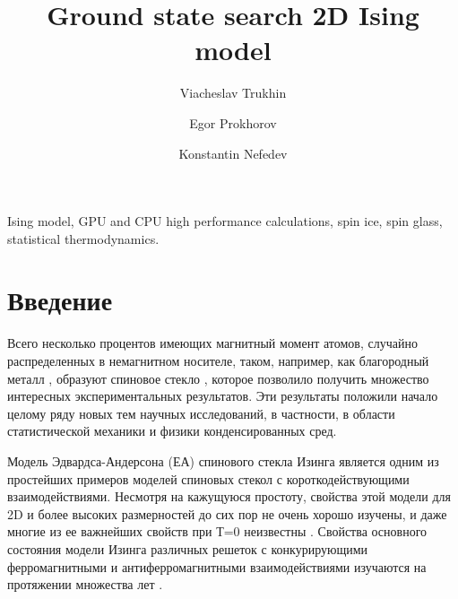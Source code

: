 \documentclass[utf8, babel, sor, jor, amsmath, amssymb, reprint]{elsarticle} %
\begin{document}
\begin{frontmatter}


\title{Ground state search 2D Ising model}

\author[mainaddress, secondaryaddress]{Viacheslav Trukhin}

\author[mainaddress]{Egor Prokhorov}

\author[mainaddress, secondaryaddress]{Konstantin Nefedev}


\address[mainaddress]{Far Eastern Federal University, Vladivostok, Russky Island, 10 Ajax Bay, 690922, the Russian Federation}
\address[secondaryaddress]{Institute of Applied Mathematics, Far Eastern Branch, Russian Academy of Science, Vladivostok, Radio 7, 690041, the Russian Federation}

\begin{abstract}


\end{abstract}


\begin{keyword}
Ising model, GPU and CPU high performance calculations, spin ice, spin glass, statistical thermodynamics.

\end{keyword}


\end{frontmatter}

\linenumbers
\newpage
\tableofcontents

\newpage
\section{Введение}

Всего несколько процентов имеющих магнитный момент атомов, случайно распределенных в немагнитном носителе, таком, например, как благородный металл  \cite{finkler1989spin}, образуют спиновое стекло \cite{belokon2006spin}, которое позволило получить множество интересных экспериментальных результатов. Эти результаты положили начало целому ряду новых тем научных исследований, в частности, в области статистической механики и физики конденсированных сред.

Модель Эдвардса-Андерсона (ЕА) спинового стекла Изинга является одним из простейших примеров моделей спиновых стекол с короткодействующими взаимодействиями. Несмотря на кажущуюся простоту, свойства этой модели для 2D и более высоких размерностей до сих пор не очень хорошо изучены, и даже многие из ее важнейших свойств при Т=0 неизвестны \cite{pal1996ground}. Свойства основного состояния модели Изинга различных решеток с конкурирующими ферромагнитными и антиферромагнитными взаимодействиями изучаются на протяжении множества лет \cite{lebrecht2004plaquette, valdes2012j, lebrecht2015j}. 
\end{document}
